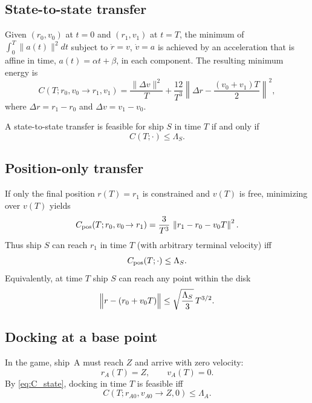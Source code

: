 \documentclass[journal, a4paper]{IEEEtran}
\begin{document}
\subsection{State-to-state transfer}
Given $(r_0,v_0)$ at $t=0$ and $(r_1,v_1)$ at $t=T$, the minimum of $\int_0^T \|a(t)\|^2dt$ subject to $\dot r=v$, $\dot v=a$ is achieved by an acceleration that is affine in time, $a(t)=\alpha t+\beta$, in each component.
The resulting minimum energy is
\begin{equation}
C(T;r_0,v_0\!\to r_1,v_1)
=
\frac{\|\Delta v\|^2}{T}
+
\frac{12}{T^3}
\left\|
\Delta r-\frac{(v_0+v_1)T}{2}
\right\|^2,
\label{eq:C_state}
\end{equation}
where $\Delta r=r_1-r_0$ and $\Delta v=v_1-v_0$.

A state-to-state transfer is feasible for ship $S$ in time $T$ if and only if
\begin{equation}
C(T;\cdot)\le \Lambda_S.
\label{eq:feasible_state}
\end{equation}

\subsection{Position-only transfer}
If only the final position $r(T)=r_1$ is constrained and $v(T)$ is free, minimizing over $v(T)$ yields
\begin{equation}
C_{\rm pos}(T;r_0,v_0\!\to r_1)
=
\frac{3}{T^3}\,
\left\|r_1-r_0-v_0T\right\|^2.
\label{eq:C_pos}
\end{equation}
Thus ship $S$ can reach $r_1$ in time $T$ (with arbitrary terminal velocity) iff
\begin{equation}
C_{\rm pos}(T;\cdot)\le \Lambda_S.
\end{equation}
Equivalently, at time $T$ ship $S$ can reach any point within the disk
\begin{equation}
\Bigl\|r-(r_0+v_0T)\Bigr\| \le \sqrt{\frac{\Lambda_S}{3}}\,T^{3/2}.
\label{eq:pos_disk}
\end{equation}

\subsection{Docking at a base point}
In the game, ship~A must reach $Z$ and arrive with zero velocity:
\begin{equation}
r_A(T)=Z,\qquad v_A(T)=0.
\label{eq:dock_bc}
\end{equation}
By \eqref{eq:C_state}, docking in time $T$ is feasible iff
\begin{equation}
C(T;r_{A0},v_{A0}\!\to Z,0)\le \Lambda_A.
\label{eq:A_dock_feasible}
\end{equation}
\end{document}
